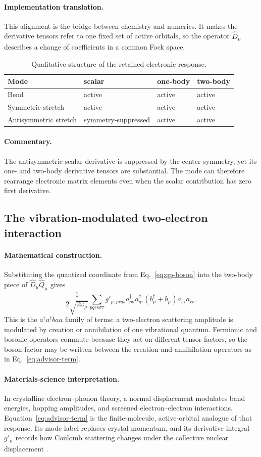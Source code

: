 \documentclass[10pt,twocolumn]{article}
\newcommand{\mathderiv}{\paragraph{Mathematical construction.}}
\newcommand{\commentaryblock}{\paragraph{Commentary.}}
\newcommand{\materials}{\paragraph{Materials-science interpretation.}}
\newcommand{\impl}{\paragraph{Implementation translation.}}
\begin{document}
\impl This alignment is the bridge between chemistry and numerics.  It makes
the derivative tensors refer to one fixed set of active orbitals, so the
operator $\hat D_\mu$ describes a change of coefficients in a common Fock
space.

\begin{table}[ht]
\centering
\caption{Qualitative structure of the retained electronic response.}
\scriptsize
\begin{tabular}{@{}p{}p{}
  p{}p{}@{}}
\toprule
Mode & scalar & one-body & two-body\\\midrule
Bend & active & active & active\\
Symmetric stretch & active & active & active\\
Antisymmetric stretch & symmetry-suppressed & active & active\\
\bottomrule
\end{tabular}
\label{tab:derivative-structure}
\end{table}

\commentaryblock The antisymmetric scalar derivative is suppressed by the
center symmetry, yet its one- and two-body derivative tensors are substantial.
The mode can therefore rearrange electronic matrix elements even when the
scalar contribution has zero first derivative.

\subsection*{The vibration-modulated two-electron interaction}

\mathderiv Substituting the quantized coordinate from
Eq.~\eqref{eq:qp-boson} into the two-body piece of
$\hat D_\mu\hat Q_\mu$ gives
\begin{equation}
\boxed{
\frac{1}{2\sqrt{2\omega_\mu}}
\sum_{pqrs\sigma\tau}g'_{\mu,prqs}
a_{p\sigma}^\dagger a_{q\tau}^\dagger
(b_\mu^\dagger+b_\mu)a_{s\tau}a_{r\sigma}.}
\label{eq:advisor-term}
\end{equation}
This is the $a^\dagger a^\dagger b a a$ family of terms: a two-electron
scattering amplitude is modulated by creation or annihilation of one
vibrational quantum.  Fermionic and bosonic operators commute because they act
on different tensor factors, so the boson factor may be written between the
creation and annihilation operators as in Eq.~\eqref{eq:advisor-term}.

\materials In crystalline electron--phonon theory, a normal displacement
modulates band energies, hopping amplitudes, and screened electron--electron
interactions.  Equation~\eqref{eq:advisor-term} is the finite-molecule,
active-orbital analogue of that response.  Its mode label replaces crystal
momentum, and its derivative integral $g'_\mu$ records how Coulomb scattering
changes under the collective nuclear displacement \cite{Giustino}.
\end{document}
